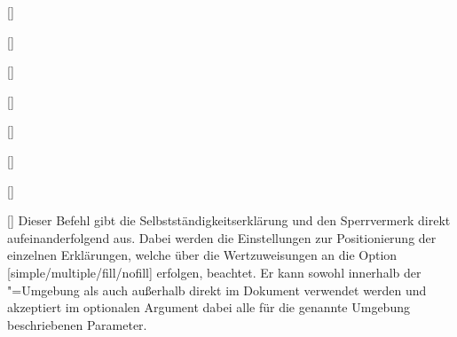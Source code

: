 \begin{Declaration}{\LParameter}
\begin{Declaration}{[]}
\begin{Declaration}[v2.02]{%
  []%
}
\begin{Declaration}[v2.02]{[]}
\begin{Declaration}{[\PSet]}
\begin{Declaration}{[]}
\begin{Declaration}{[]}
\begin{Declaration}{[]}
\begin{Declaration}{[]}
\printdeclarationlist%
%
%
Dieser Befehl gibt die Selbstständigkeitserklärung und den Sperrvermerk direkt 
aufeinanderfolgend aus. Dabei werden die Einstellungen zur Positionierung der 
einzelnen Erklärungen, welche über die Wertzuweisungen an die Option 
[simple/multiple/fill/nofill] erfolgen, beachtet. Er kann 
sowohl innerhalb der "=Umgebung als auch außerhalb 
direkt im Dokument verwendet werden und akzeptiert im optionalen Argument dabei 
alle für die genannte Umgebung beschriebenen Parameter.
\end{Declaration}
\end{Declaration}
\end{Declaration}
\end{Declaration}
\end{Declaration}
\end{Declaration}
\end{Declaration}
\end{Declaration}
\end{Declaration}


